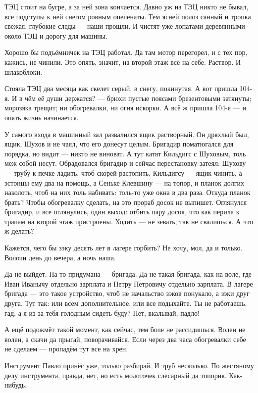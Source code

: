 ТЭЦ стоит на бугре, а за ней зона кончается. Давно уж на ТЭЦ никто не бывал, все подступы к ней 
снегом ровным опеленаты. Тем ясней полоз санный и тропка свежая, глубокие следы --- наши 
прошли. И чистят уже лопатами деревянными около ТЭЦ и дорогу для машины.

Хорошо бы подъёмничек на ТЭЦ работал. Да там мотор перегорел, и с тех пор, кажись, не чинили. 
Это опять, значит, на второй этаж всё на себе. Раствор. И шлакоблоки.

Стояла ТЭЦ два месяца как скелет серый, в снегу, покинутая. А вот пришла 104-я. И в чём её души 
держатся? --- брюхи пустые поясами брезентовыми затянуты; морозяка трещит; ни обогревалки, ни 
огня искорки. А всё ж пришла 104-я --- и опять жизнь начинается.

У самого входа в машинный зал развалился ящик растворный. Он дряхлый был, ящик, Шухов и не 
чаял, что его донесут целым. Бригадир поматюгался для порядка, но видит --- никто не виноват. А 
тут катят Кильдигс с Шуховым, толь меж собой несут. Обрадовался бригадир и сейчас 
перестановку затеял: Шухову --- трубу к печке ладить, чтоб скорей растопить, Кильдигсу --- ящик 
чинить, а эстонцы ему два на помощь, а Сеньке Клевшину --- на топор, и планок долгих наколоть, 
чтоб на них толь набивать: толь-то уже окна в два раза. Откуда планок брать? Чтобы обогревалку 
сделать, на это прораб досок не выпишет. Оглянулся бригадир, и все оглянулись, один выход: 
отбить пару досок, что как перила к трапам на второй этаж пристроены. Ходить --- не зевать, так 
не свалишься. А что ж делать?

Кажется, чего бы зэку десять лет в лагере горбить? Не хочу, мол, да и только. Волочи день до 
вечера, а ночь наша.

Да не выйдет. На то придумана --- бригада. Да не такая бригада, как на воле, где Иван Иванычу 
отдельно зарплата и Петру Петровичу отдельно зарплата. В лагере бригада --- это такое 
устройство, чтоб не начальство зэков понукало, а зэки друг друга. Тут так: или всем 
дополнительное, или все подыхайте. Ты не работаешь, гад, а я из-за тебя голодным сидеть буду? 
Нет, вкалывай, падло!

А ещё подожмёт такой момент, как сейчас, тем боле не рассидишься. Волен не волен, а скачи да 
прыгай, поворачивайся. Если через два часа обогревалки себе не сделаем --- пропадём тут все на 
хрен.

Инструмент Павло принёс уже, только разбирай. И труб несколько. По жестяному делу 
инструмента, правда, нет, но есть молоточек слесарный да топорик. Как-нибудь.

